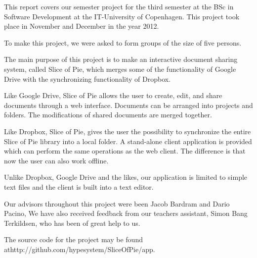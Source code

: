 This report covers our semester project for the third semester at the BSc in Software Development at the IT-University of Copenhagen. This project took place in November and December in the year 2012. 

To make this project, we were asked to form groups of the size of five persons. 

The main purpose of this project is to make an interactive document sharing system, called Slice of Pie, which merges some of the functionality of Google Drive with the synchronizing functionality of Dropbox.
 
Like Google Drive, Slice of Pie allows the user to create, edit, and share documents through a web interface. Documents can be arranged into projects and folders. The modifications of shared documents are merged together.

Like Dropbox, Slice of Pie, gives the user the possibility to synchronize the entire Slice of Pie library into a local folder. A stand-alone client application is provided which can perform the same operations as the web client. The difference is that now the user can also work offline.

Unlike Dropbox, Google Drive and the likes, our application is limited to simple text files and the client is built into a text editor.

Our advisors throughout this project were been Jacob Bardram and Dario Pacino,
We have also received feedback from our teachers assistant, Simon Bang Terkildsen, who has been of great help to us.

The source code for the project may be found at\newline http://github.com/hypesystem/SliceOfPie/app.